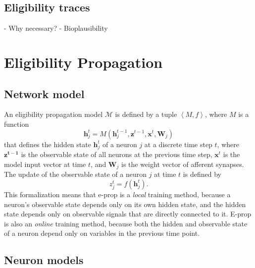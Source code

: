     \subsection{Eligibility traces}
        \begin{tcolorbox}[colback=orange]
        - Why necessary?
        - Bioplausibility

        \vspace{12cm}

        \end{tcolorbox}

\section{Eligibility Propagation}

    \subsection{Network model}
        An eligibility propagation model $\mathcal{M}$ is defined by a tuple $\left<M, f\right>$,
        where $M$ is a function
        \begin{equation}
        \mathbf{h}^t_j = M\left(\mathbf{h}_j^{t-1}, \mathbf{z}^{t-1}, \mathbf{x}^t, \mathbf{W}_j\right)
        \end{equation}
        that defines the hidden state $\mathbf{h}_j^t$ of a neuron $j$ at a discrete time step $t$, where $\mathbf{z^{t-1}}$ is the observable state of all neurons at the previous time step, $\mathbf{x}^t$ is the model input vector at time $t$, and $\mathbf{W}_j$ is the weight vector of afferent synapses.
        The update of the observable state of a neuron $j$ at time $t$ is defined by
        \begin{equation}
        z^t_j = f\left(\mathbf{h}_j^t\right).
        \end{equation}
        This formalization means that e-prop is a \emph{local} training method, because a neuron's observable state depends only on its own hidden state, and the hidden state depends only on observable signals that are directly connected to it.
        E-prop is also an \emph{online} training method, because both the hidden and observable state of a neuron depend only on variables in the previous time point.

    \subsection{Neuron models}

